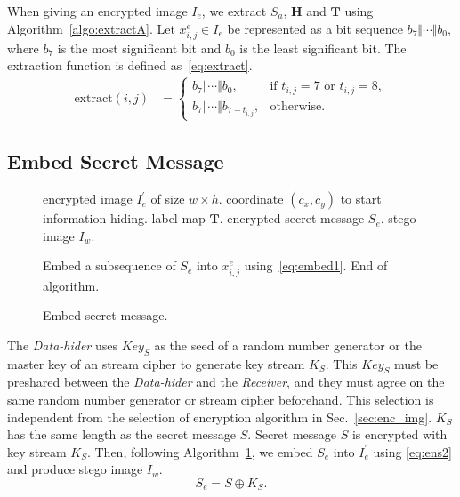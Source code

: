 \documentclass{elsarticle}
\begin{document}
	When giving an encrypted image \(I_e\), we extract \(S_a\), \(\mathbf{H}\) and \(\mathbf{T}\) using Algorithm~\ref{algo:extractA}.
	Let \(x^e_{i, j} \in I_e\) be represented as a bit sequence \(b_7 \Vert \cdots \Vert b_0\), where \(b_7\) is the most significant bit and \(b_0\) is the least significant bit. 
	The extraction function is defined as~\eqref{eq:extract}.
	\begin{align}
		\label{eq:extract}
		\mathrm{extract}(i, j)  &= 
		\begin{cases}
			b_7 \Vert \cdots \Vert b_0              ,& \text{if } t_{i, j} = 7 \text{ or } t_{i, j} = 8 , \\
			b_7 \Vert \cdots \Vert b_{7 - t_{i, j}} ,& \text{otherwise}.
		\end{cases}
	\end{align}
	
	
	
	
	
	\subsection{Embed Secret Message}
	
	\begin{figure}[!t]
		\begin{algorithm}[H]
			\caption{Embed secret message.}
			\label{algo:hider1}
			
			\begin{algorithmic}[1]
				\Require encrypted image \(I_e^\prime\) of size \(w \times h\).
				\Require coordinate \((c_x, c_y)\) to start information hiding.
				\Require label map \(\mathbf{T}\).
				\Require encrypted secret message \(S_e\).
				\Ensure stego image \(I_w\).
				
				\State			Embed a subsequence of \(S_e\) into \(x^e_{i, j}\) using~\eqref{eq:embed1}.
				\State			End of algorithm.
				\EndIf
				\EndFor
			\end{algorithmic}
		\end{algorithm}
	\end{figure}
	
	The \emph{Data-hider} uses \(Key_S\) as the seed of a random number generator or the master key of an stream cipher to generate key stream \(K_S\).
	This \(Key_S\) must be preshared between the \emph{Data-hider} and the \emph{Receiver}, and they must agree on the same random number generator or stream cipher beforehand.
	This selection is independent from the selection of encryption algorithm in Sec.~\ref{sec:enc_img}.
	\(K_S\) has the same length as the secret message \(S\).
	Secret message \(S\) is encrypted with key stream \(K_S\). 
	Then, following Algorithm~\ref{algo:hider1}, we embed \(S_e\) into \(I_e^\prime\) using \eqref{eq:ens2} and produce stego image \(I_w\).
	\begin{equation}
		\label{eq:ens2}
		S_e = S \oplus K_S .
	\end{equation}
	
\end{document}
